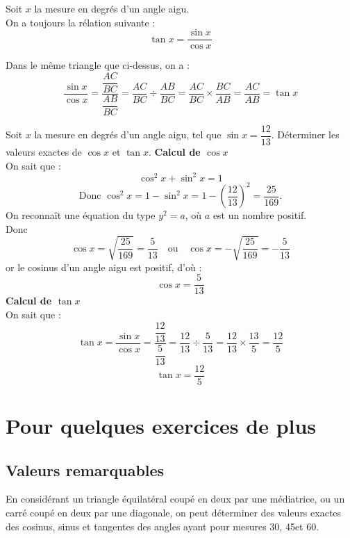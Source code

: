 \begin{propriete}
Soit $x$ la mesure en degrés d'un angle aigu.\\
On a toujours la rélation suivante :
\[\tan x = \dfrac{\sin x}{\cos x}\]
\end{propriete}	

\begin{preuve}
Dans le même triangle que ci-dessus, on a :
\[\dfrac{\sin x}{\cos x}=\dfrac{\dfrac{AC}{BC}}{\dfrac{AB}{BC}}=\dfrac{AC}{BC}\div\dfrac{AB}{BC}=\dfrac{AC}{BC}\times\dfrac{BC}{AB}=\dfrac{AC}{AB}=\tan x\]
\end{preuve}

	\begin{methode*2}
\exercice
Soit $x$ la mesure en degrés d'un angle aigu, tel que $\sin x=\dfrac{12}{13}$. Déterminer les valeurs exactes de $\cos x$ et $\tan x$. 	
\correction	
\textbf{Calcul de $\cos x$}\\
On sait que :
\[\cos^2 x+\sin^2 x =1\]
\[\mbox{Donc }\cos^2 x = 1-\sin^2 x = 1-\left(\dfrac{12}{13}\right)^2=\dfrac{25}{169}.\]
On reconnaît une équation du type $y^2=a$, où $a$ est un nombre positif.\\
Donc	\[\cos x =\sqrt{\dfrac{25}{169}}=\dfrac{5}{13}\quad\mbox{ou}\quad\cos x =-\sqrt{\dfrac{25}{169}}=-\dfrac{5}{13}\]  
or le cosinus d'un angle aigu est positif, d'où :
\[\cos x =\dfrac{5}{13}\]	
\textbf{Calcul de $\tan x$}\\
On sait que :
\[\tan x = \dfrac{\sin x }{\cos x}=\dfrac{\dfrac{12}{13}}{\dfrac{5}{13}}=\dfrac{12}{13}\div\dfrac{5}{13}=\dfrac{12}{13}\times\dfrac{13}{5}=\dfrac{12}{5}\]
\[\tan x =\dfrac{12}{5}\]
	\end{methode*2}

\section{Pour quelques exercices de plus}
	\subsection{Valeurs remarquables}
	
En considérant un triangle équilatéral coupé en deux par une médiatrice, ou un carré coupé en deux par une diagonale, on peut déterminer des valeurs exactes des cosinus, sinus et tangentes des angles ayant pour mesures 30\degres, 45\degres et 60\degres.

